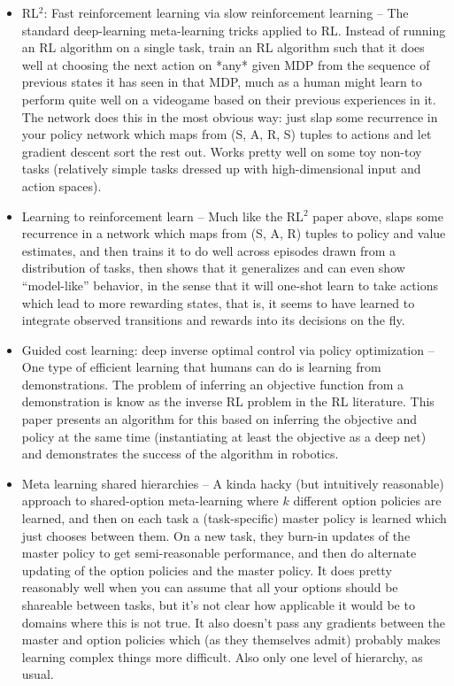 \documentclass[11pt]{article}
\begin{document}
\begin{itemize}
\item RL$^2$: Fast reinforcement learning via slow reinforcement learning -- The standard deep-learning meta-learning tricks applied to RL. Instead of running an RL algorithm on a single task, train an RL algorithm such that it does well at choosing the next action on *any* given MDP from the sequence of previous states it has seen in that MDP, much as a human might learn to perform quite well on a videogame based on their previous experiences in it. The network does this in the most obvious way: just slap some recurrence in your policy network which maps from (S, A, R, S) tuples to actions and let gradient descent sort the rest out. Works pretty well on some toy non-toy tasks (relatively simple tasks dressed up with high-dimensional input and action spaces).
\item Learning to reinforcement learn -- Much like the RL$^2$ paper above, slaps some recurrence in a network which maps from (S, A, R) tuples to policy and value estimates, and then trains it to do well across episodes drawn from a distribution of tasks, then shows that it generalizes and can even show ``model-like'' behavior, in the sense that it will one-shot learn to take actions which lead to more rewarding states, that is, it seems to have learned to integrate observed transitions and rewards into its decisions on the fly. 
\item Guided cost learning: deep inverse optimal control via policy optimization -- One type of efficient learning that humans can do is learning from demonstrations. The problem of inferring an objective function from a demonstration is know as the inverse RL problem in the RL literature. This paper presents an algorithm for this based on inferring the objective and policy at the same time (instantiating at least the objective as a deep net) and demonstrates the success of the algorithm in robotics. \citep{Finn2016}
\item Meta learning shared hierarchies -- A kinda hacky (but intuitively reasonable) approach to shared-option meta-learning where \(k\) different option policies are learned, and then on each task a (task-specific) master policy is learned which just chooses between them. On a new task, they burn-in updates of the master policy to get semi-reasonable performance, and then do alternate updating of the option policies and the master policy. It does pretty reasonably well when you can assume that all your options should be shareable between tasks, but it's not clear how applicable it would be to domains where this is not true. It also doesn't pass any gradients between the master and option policies which (as they themselves admit) probably makes learning complex things more difficult. Also only one level of hierarchy, as usual. \citep{Frans2018} 

\end{itemize}
\end{document}
